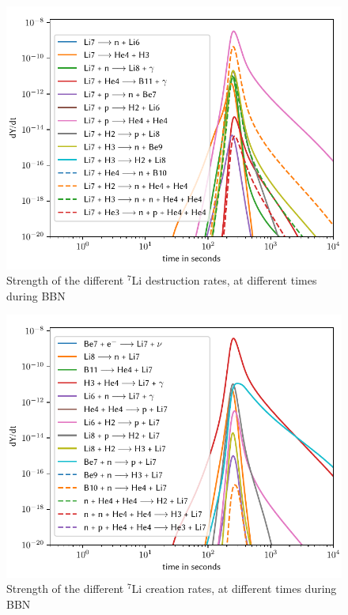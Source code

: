 \begin{figure}[ht]
    \includegraphics[width=5.1in]{figures/app/Li7destruct.pdf}
    \caption{Strength of the different ${}^7$Li destruction rates, at different times during BBN}
    \label{fig:Li7destruct}
\end{figure}

\begin{figure}[ht]
    \includegraphics[width=5.1in]{figures/app/Li7create.pdf}
    \caption{Strength of the different ${}^7$Li creation rates, at different times during BBN}
    \label{fig:Li7create}
\end{figure}

